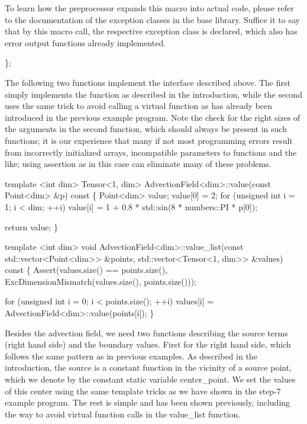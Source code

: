 To learn how the preprocessor expands this macro into actual code, please refer to the documentation of the exception classes in the base library. Suffice it to say that by this macro call, the respective exception class is declared, which also has error output functions already implemented.


\begin{DoxyCode}
\};
\end{DoxyCode}


The following two functions implement the interface described above. The first simply implements the function as described in the introduction, while the second uses the same trick to avoid calling a virtual function as has already been introduced in the previous example program. Note the check for the right sizes of the arguments in the second function, which should always be present in such functions; it is our experience that many if not most programming errors result from incorrectly initialized arrays, incompatible parameters to functions and the like; using assertion as in this case can eliminate many of these problems.


\begin{DoxyCode}
\textcolor{keyword}{template} <\textcolor{keywordtype}{int} dim>
Tensor<1, dim> AdvectionField<dim>::value(\textcolor{keyword}{const} Point<dim> &p)\textcolor{keyword}{ const}
\textcolor{keyword}{}\{
    Point<dim> value;
    value[0] = 2;
    \textcolor{keywordflow}{for} (\textcolor{keywordtype}{unsigned} \textcolor{keywordtype}{int} i = 1; i < dim; ++i)
        value[i] = 1 + 0.8 * std::sin(8 * numbers::PI * p[0]);

    \textcolor{keywordflow}{return} value;
\}


\textcolor{keyword}{template} <\textcolor{keywordtype}{int} dim>
\textcolor{keywordtype}{void} AdvectionField<dim>::value\_list(\textcolor{keyword}{const} std::vector<Point<dim>> &points,
                                     std::vector<Tensor<1, dim>> &values)\textcolor{keyword}{ const}
\textcolor{keyword}{}\{
    Assert(values.size() == points.size(),
           ExcDimensionMismatch(values.size(), points.size()));

    \textcolor{keywordflow}{for} (\textcolor{keywordtype}{unsigned} \textcolor{keywordtype}{int} i = 0; i < points.size(); ++i)
        values[i] = AdvectionField<dim>::value(points[i]);
\}
\end{DoxyCode}


Besides the advection field, we need two functions describing the source terms ({\ttfamily right hand side}) and the boundary values. First for the right hand side, which follows the same pattern as in previous examples. As described in the introduction, the source is a constant function in the vicinity of a source point, which we denote by the constant static variable {\ttfamily center\+\_\+point}. We set the values of this center using the same template tricks as we have shown in the step-\/7 example program. The rest is simple and has been shown previously, including the way to avoid virtual function calls in the {\ttfamily value\+\_\+list} function.


